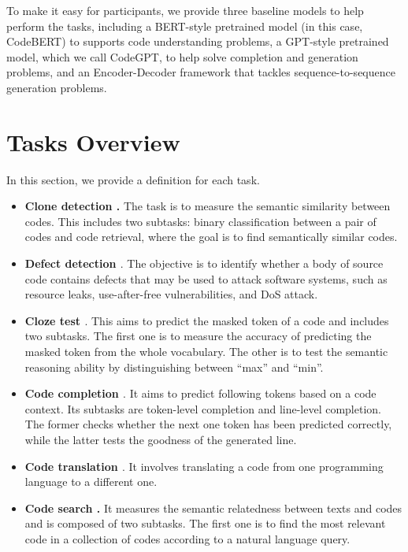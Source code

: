 \documentclass[sigconf,nonacm,screen]{acmart}
\begin{document}
To make it easy for participants, we provide three baseline models to help perform the tasks, including a BERT-style pretrained model (in this case, CodeBERT) to supports code understanding problems, a GPT-style pretrained model, which we call CodeGPT, to help solve completion and generation problems, and an Encoder-Decoder framework that tackles sequence-to-sequence generation problems. 


\section{Tasks Overview}
In this section, we provide a definition for each task. 
\begin{itemize}
[wide, labelwidth=!, labelindent=5pt,label={}]
    \item \textbf{Clone detection \cite{svajlenko2014towards,mou2016convolutional}.} The task is to measure the semantic similarity between codes. This includes two subtasks: binary classification between a pair of codes and code retrieval, where the goal is to find semantically similar codes.
    \item \textbf{Defect detection \cite{zhou2019devign}}. The objective is to  identify whether a body of source code contains defects that may be used to attack software systems, such as resource leaks, use-after-free vulnerabilities, and DoS attack. 
    \item \textbf{Cloze test \cite{feng2020codebert}}. This aims to predict the masked token of a code and includes two subtasks. The first one is to measure the accuracy of 
predicting the
masked token from the whole vocabulary. The other is to test the semantic reasoning ability by distinguishing between ``max'' and ``min''.
\item \textbf{Code completion \cite{raychev2016probabilistic,allamanis2013mining}}. It aims to predict following tokens based on a code context. Its subtasks are token-level completion and line-level completion.  The former checks whether the next one token has been predicted correctly, while the latter tests the goodness of the generated line.
\item \textbf{Code translation \cite{nguyen2015divide}}. It involves translating a code from one programming language to a different one. 
    \item \textbf{Code search \cite{husain2019codesearchnet}.} It measures the semantic relatedness between texts and codes and is composed of two subtasks. 
    The first one is to find the most relevant code in a collection of codes according to a natural language query.

\end{itemize}
\end{document}
